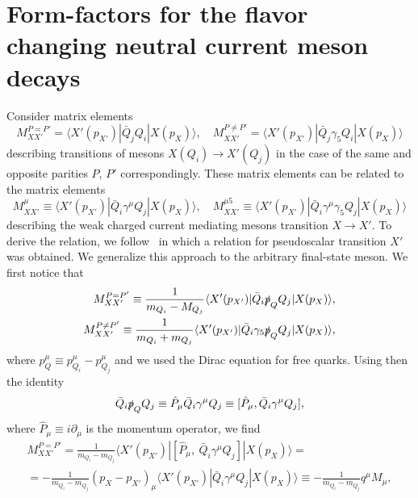 \documentclass[a4paper,12pt,dvipsnames,usernames]{article}
\begin{document}
\section{Form-factors for the flavor changing neutral current meson decays}
\label{sec:hadronic-form-factors}
Consider matrix elements
\begin{equation}
    M_{XX'}^{P=P'} =\langle X'(p_{X'})|\bar{Q}_{j}Q_{i}|X(p_{X})\rangle, \quad M_{XX'}^{P \neq P'}= \langle X'(p_{X'})|\bar{Q}_{j}\gamma_{5}Q_{i}|X(p_{X})\rangle
    \label{eq:meson-decay-scalar-matrix-element}
\end{equation}
describing transitions of mesons $X(Q_{i}) \to X'(Q_{j})$ in the case of the same and opposite parities $P$, $P'$ correspondingly. These matrix elements can be related to the matrix elements
\begin{equation}
    M^{\mu}_{XX'} \equiv \langle X'(p_{X'})|\bar{Q}_{i}\gamma^{\mu}Q_{j}|X(p_{X})\rangle, \quad M^{\mu 5}_{XX'} \equiv \langle X'(p_{X'})|\bar{Q}_{i}\gamma^{\mu}\gamma_{5}Q_{j}|X(p_{X})\rangle
    \label{eq:meson-decay-vector-matrix-element}
\end{equation}
describing the weak charged current mediating mesons transition $X \to X'$. To derive the relation, we follow~\cite{Bobeth:2001sq} in which a relation for pseudoscalar transition $X'$ was obtained. We generalize this approach to the arbitrary final-state meson. We first notice that
\begin{align}
    M_{XX'}^{P = P'} \equiv \frac{1}{m_{Q_{i}} - M_{Q_{j}}}\langle X'(p_{X'})|\bar{Q}_{i}\slashed{p}_{Q}Q_{j}|X(p_{X})\rangle, \\ M_{XX'}^{P \neq P'} \equiv \frac{1}{m_{Q_{i}} + m_{Q_{j}}}\langle X'(p_{X'})|\bar{Q}_{i}\gamma_{5}\slashed{p}_{Q}Q_{j}|X(p_{X})\rangle,
    \label{eq:meson-decay-scalar-pseudoscalar-matrix-element}
\end{align}
where $p_{Q}^{\mu} \equiv p^{\mu}_{Q_{i}} - p^{\mu}_{Q_{j}}$ and we used the Dirac equation for free quarks. Using then the identity
\begin{equation}
    \bar{Q}_{i}\slashed{p}_{Q}Q_{j} \equiv \hat{P}_{\mu}\bar{Q}_{i}\gamma^{\mu}Q_{j} \equiv [\hat{P}_{\mu},\bar{Q}_{i}\gamma^{\mu}Q_{j}],
\end{equation}
where $\hat{P}_{\mu} \equiv i\partial_{\mu}$ is the momentum operator, we find
\begin{multline}
    M_{XX'}^{P = P'} = \frac{1}{m_{Q_{i}} - m_{Q_{j}}}\langle X'(p_{X'})|[\hat{P}_{\mu},\ \bar{Q}_{i}\gamma^{\mu}Q_{j}]|X(p_{X})\rangle = \\ = -\frac{1}{m_{Q_{i}} - m_{Q_{j}}}(p_{X}-p_{X'})_{\mu}\langle X'(p_{X'})| \bar{Q}_{i}\gamma^{\mu}Q_{j}|X(p_{X})\rangle \equiv -\frac{1}{m_{Q_{i}} - m_{Q_{j}}}q^{\mu}M_{\mu},
    \label{eq:trick}
\end{multline}
\end{document}
